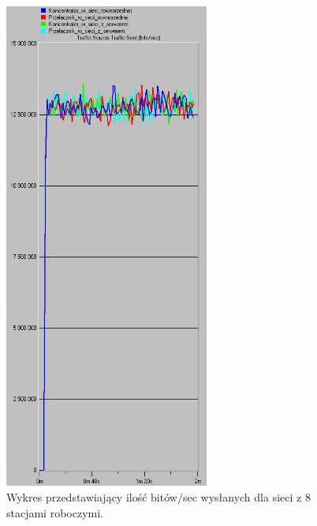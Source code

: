 \documentclass{article}
\begin{document}
\begin{figure}[H]
  \centering
  \includegraphics[width=0.60\textwidth]{screens/8_sent.png}
 \caption{Wykres przedstawiający ilość bitów/sec wysłanych dla sieci z 8 stacjami roboczymi.}
 \label{fig:2stacjes}
\end{figure}
\end{document}
